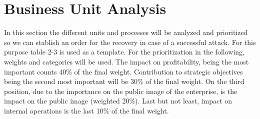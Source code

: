 \section{Business Unit Analysis}\label{sec:BusinessUnitAnalysis}
In this section the different units and processes will be analyzed and prioritized so we can stablish an order for the recovery in case of a successful attack. For this purpose table 2-3 \cite{whitman3} is used as a template. For the prioritization in the following, weights and categories will be used. The impact on profitability, being the most important counts 40\% of the final weight. Contribution to strategic objectives being the second most important will be 30\% of the final weight. On the third position, due to the importance on the public image of the enterprise, is the impact on the public image (weighted 20\%). Last but not least, impact on internal operations is the last 10\% of the final weight.

